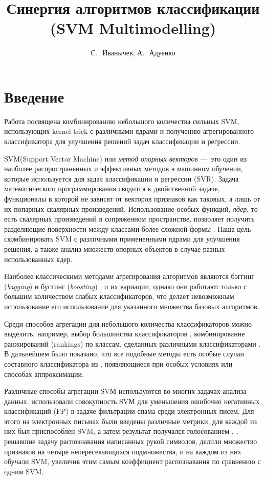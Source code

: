 \documentclass[12pt,twoside]{article}
\title
    {Синергия алгоритмов классификации (SVM Multimodelling)}
\author
    {С.\,~Иванычев, А.\,~Адуенко}
\theoremstyle{plain}
\theoremstyle{remark}
\theoremstyle{definition}
\begin{document}
\maketitle

\section{Введение}
Работа посвящена комбинированию небольшого количества сильных SVM, использующих kernel-trick с различными ядрами и получению агрегированного классификатора для улучшения решений задач классификации и регрессии.

    SVM(Support Vector Machine) или \emph{метод опорных векторов}\cite{Cortes1995, Boser1992} ---~это один из наиболее распространенных и эффективных методов в машинном обучении, которые используется для задач классификации и регрессии (SVR). Задача математического программирования сводится к двойственной задаче, функционалы в которой не зависят от векторов признаков как таковых, а лишь от их попарных скалярных произведений. Использование особых функций, \emph{ядер}, то есть скалярных произведений в сопряженном пространстве, позволяет получить разделяющие поверхности между классами более сложной формы \cite{Smola2004}. Наша цель --- скомбинировать SVM
    с различными примененными ядрами для улучшения решения, а также анализ множеств опорных объектов в случае разных использованных ядер.

    Наиболее классическими методами агрегирования алгоритмов являются
    бэггинг (\emph{bagging})\cite{Breiman1996} и бустинг (\emph{boosting}) \cite{Freund1995}, и их
    вариации, однако они работают только с  большим количеством слабых классификаторов, что делает невозможным использование его использование для указанного множества базовых алгоритмов.

    Среди способов агрегации для небольшого количества классификаторов можно
    выделить, например, выбор большинства классификаторов \cite{Franke1992},
    комбинирование ранжирований (rankings) по классам, сделанных различными
    классификаторами \cite{Ho1994}. В дальнейшем было показано, что все подобные
    методы есть особые случаи составного классификатора из \cite{Kittler1996},
    появляющиеся при особых условиях или способах аппроксимации.

    Различные способы агрегации SVМ используются во многих задачах анализа данных.
    \cite{Martin-merino2007} использовали совокупность SVМ для уменьшения ошибочно негативных классификаций (FP) в задаче фильтрации спама среди электронных писем.
    Для этого на электронных письмах были введены различные метрики, для каждой из них был приспособлен SVM, а затем результат получался голосованием \cite{Kittler1996}.
    \cite{Gorgevik2005}, решавшие задачу распознавания написанных рукой символов, делили множество признаков на четыре непересекающихся подмножества, и на каждом из них обучали SVM, увеличив этим самым коэффициент распознавания по сравнению с одним SVM.
\end{document}
